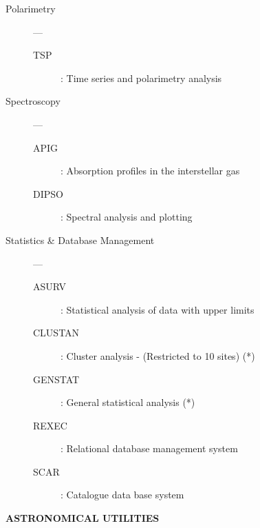 \begin{description}
\item [Polarimetry] ---
\begin{description}
\item [TSP] : Time series and polarimetry analysis 
\end{description}

\item [Spectroscopy] ---
\begin{description}
\item [APIG] : Absorption profiles in the interstellar gas
\item [DIPSO] : Spectral analysis and plotting
\end{description}

\item [Statistics \& Database Management] ---
\begin{description}
\item [ASURV] : Statistical analysis of data with upper limits
\item [CLUSTAN] : Cluster analysis - (Restricted to 10 sites) (*)
\item [GENSTAT] : General statistical analysis (*)
\item [REXEC] : Relational database management system
\item [SCAR] : Catalogue data base system 
\end{description}

\end{description}

\begin{center}
{\bf\large ASTRONOMICAL UTILITIES}
\end{center}

